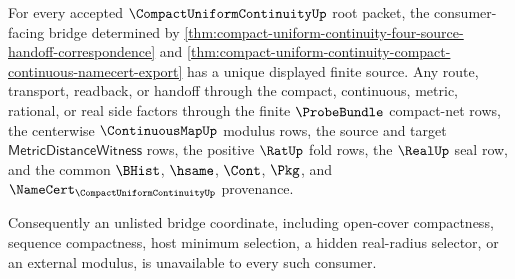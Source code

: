 \begin{theorem}
\label{thm:compact-uniform-continuity-four-source-bridge-determinacy}
For every accepted $\CompactUniformContinuityUp$ root packet, the consumer-facing bridge determined by \autoref{thm:compact-uniform-continuity-four-source-handoff-correspondence} and \autoref{thm:compact-uniform-continuity-compact-continuous-namecert-export} has a unique displayed finite source. Any route, transport, readback, or handoff through the compact, continuous, metric, rational, or real side factors through the finite $\ProbeBundle$ compact-net rows, the centerwise $\ContinuousMapUp$ modulus rows, the source and target $\mathsf{MetricDistanceWitness}$ rows, the positive $\RatUp$ fold rows, the $\RealUp$ seal row, and the common $\BHist$, $\hsame$, $\Cont$, $\Pkg$, and $\NameCert_{\CompactUniformContinuityUp}$ provenance.

Consequently an unlisted bridge coordinate, including open-cover compactness, sequence compactness, host minimum selection, a hidden real-radius selector, or an external modulus, is unavailable to every such consumer.
\end{theorem}
